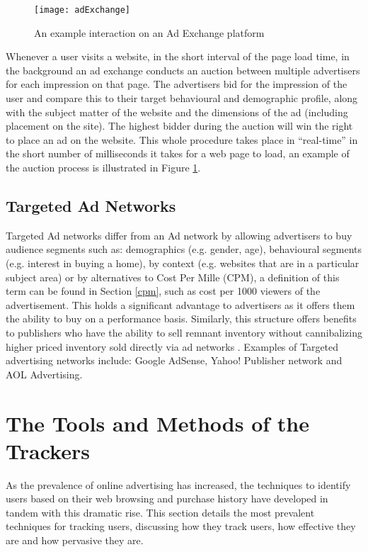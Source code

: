 \documentclass[12pt]{article}
\begin{document}
\begin{figure}[H]
    \centering
    \texttt{[image: adExchange]}
    \caption{An example interaction on an Ad Exchange platform \parencite{adExchanges}}
    \label{fig:adExchange}
\end{figure}

Whenever a user visits a website, in the short interval of the page load time, in the background an ad exchange conducts an auction between multiple advertisers for each impression on that page. The advertisers bid for the impression of the user and compare this to their target behavioural and demographic profile, along with the subject matter of the website and the dimensions of the ad (including placement on the site). The highest bidder during the auction will win the right to place an ad on the website. This whole procedure takes place in ``real-time'' in the short number of milliseconds it takes for a web page to load, an example of the auction process is illustrated in Figure \ref{fig:adExchange}. 

\subsection{ Targeted Ad Networks}
Targeted Ad networks differ from an Ad network by allowing advertisers to buy audience segments such as: demographics (e.g. gender, age),  behavioural segments (e.g. interest in buying a home), by context (e.g. websites that are in a particular subject area) or by alternatives to Cost Per Mille (CPM), a definition of this term can be found in Section \ref{cpm}, such as cost per 1000 viewers of the advertisement. This holds a significant advantage to advertisers as it offers them the ability to buy on a performance basis. Similarly, this structure offers benefits to publishers who have the ability to sell remnant inventory without cannibalizing higher priced inventory sold directly via ad networks \parencite{adExchanges}. Examples of Targeted advertising networks include: Google AdSense, Yahoo! Publisher network and AOL Advertising.

\section{The Tools and Methods of the Trackers}
As the prevalence of online advertising has increased, the techniques to identify users based on their web browsing and purchase history have developed in tandem with this dramatic rise. This section details the most prevalent techniques for tracking users, discussing how they track users, how effective they are and how pervasive they are.
\end{document}
